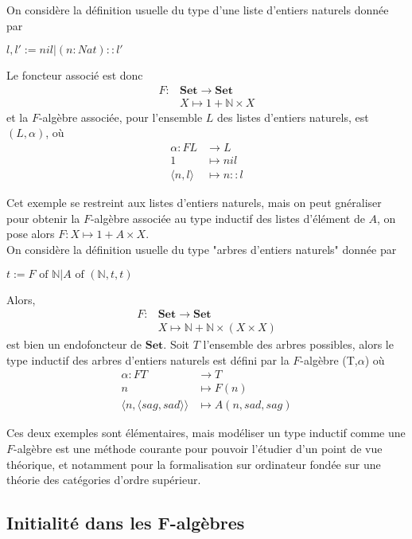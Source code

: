 \documentclass{article}
\newcommand{\N}{\mathbb{N}}
\begin{document}
On considère la définition usuelle du type d'une liste d'entiers naturels donnée par 
\begin{center}
$l,l' := nil | (n : Nat) :: l'$    
\end{center}
Le foncteur associé est donc
\begin{align*}
F : & \mathbf{Set} \rightarrow \mathbf{Set} \\       & X \mapsto 1 + \N \times X
\end{align*}
et la $F$-algèbre associée, pour l'ensemble $L$ des listes d'entiers naturels, est $(L,\alpha)$, où
\begin{align*}
\alpha :  FL &  \rightarrow L \\
          1 & \mapsto nil  \\ 
          \langle n, l \rangle & \mapsto n :: l
\end{align*}

Cet exemple se restreint aux listes d'entiers naturels, mais on peut gnéraliser pour obtenir la $F$-algèbre associée au type inductif des listes d'élément de $A$, on pose alors $F : X \mapsto 1 + A \times X$. 
\\ 
On considère la définition usuelle du type "arbres d'entiers naturels" donnée par 
\begin{center}
    $t := F \text{ of }  \N |  A \text{ of } ( \N , t, t)$
\end{center}
Alors, 
\begin{align*}
F : & \mathbf{Set} \rightarrow \mathbf{Set} \\       
    & X \mapsto \N + \N \times (X \times X)
\end{align*}
est bien un endofoncteur de $\mathbf{Set}$.
Soit $T$ l'ensemble des arbres possibles, alors le type inductif des arbres d'entiers naturels est défini par la $F$-algèbre  (T,$\alpha$) où 
\begin{align*}
\alpha :  FT &  \rightarrow T \\
            n & \mapsto F(n)  \\ 
      \langle n, \langle sag, sad \rangle \rangle &\mapsto A (n, sad, sag)
\end{align*}

Ces deux exemples sont élémentaires, mais modéliser un type inductif comme une $F$-algèbre est une méthode courante pour pouvoir l'étudier d'un point de vue théorique, et notamment pour la formalisation sur ordinateur fondée sur une théorie des catégories d'ordre supérieur.

\subsection{Initialité dans les F-algèbres}
\end{document}
